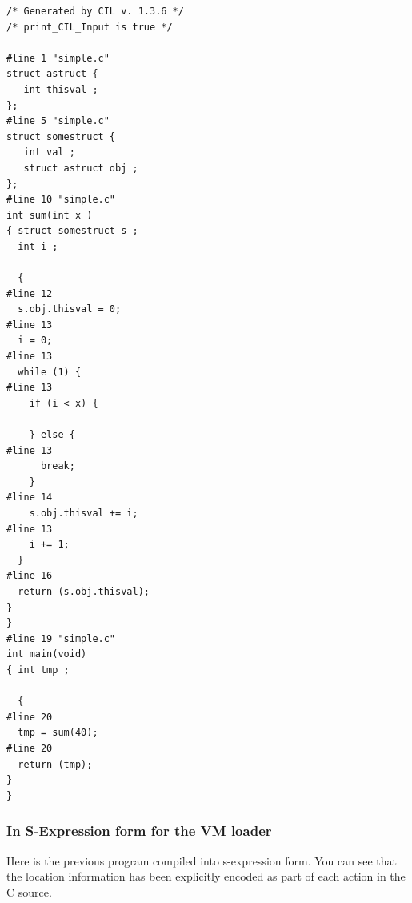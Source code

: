 \documentclass[10pt,a4paper]{report}
\begin{document}
\begin{verbatim}
/* Generated by CIL v. 1.3.6 */
/* print_CIL_Input is true */

#line 1 "simple.c"
struct astruct {
   int thisval ;
};
#line 5 "simple.c"
struct somestruct {
   int val ;
   struct astruct obj ;
};
#line 10 "simple.c"
int sum(int x ) 
{ struct somestruct s ;
  int i ;

  {
#line 12
  s.obj.thisval = 0;
#line 13
  i = 0;
#line 13
  while (1) {
#line 13
    if (i < x) {

    } else {
#line 13
      break;
    }
#line 14
    s.obj.thisval += i;
#line 13
    i += 1;
  }
#line 16
  return (s.obj.thisval);
}
}
#line 19 "simple.c"
int main(void) 
{ int tmp ;

  {
#line 20
  tmp = sum(40);
#line 20
  return (tmp);
}
}
\end{verbatim}

\subsubsection{In S-Expression form for the VM loader}
Here is the previous program compiled into s-expression form. You can see that the location information has been explicitly encoded as part of each action in the C source.
\end{document}
